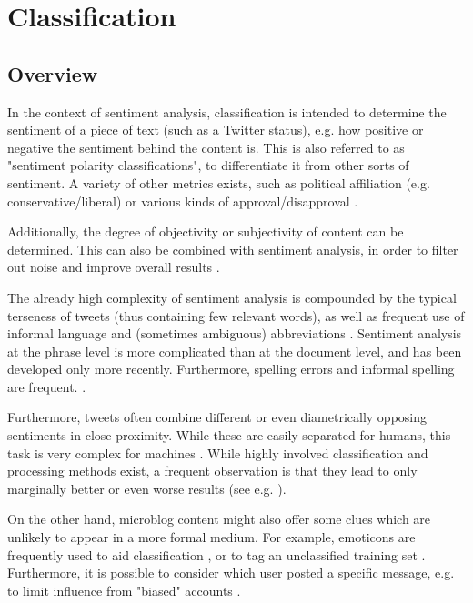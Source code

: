 \documentclass{sig-alternate}
\begin{document}
\section{Classification}

\subsection{Overview}

In the context of sentiment analysis, classification is intended to determine the sentiment of a piece of text (such as a Twitter status), e.g. how positive or negative the sentiment behind the content is. This is also referred to as "sentiment polarity classifications", to differentiate it from other sorts of sentiment. A variety of other metrics exists, such as political affiliation (e.g. conservative/liberal) or various kinds of approval/disapproval \cite{pang2008opinion}.

Additionally, the degree of objectivity or subjectivity of content can be determined. This can also be combined with sentiment analysis, in order to filter out noise and improve overall results \cite{barbosa2010robust}.


The already high complexity of sentiment analysis is compounded by the typical terseness of tweets (thus containing few relevant words), as well as frequent use of informal language and (sometimes ambiguous) abbreviations \cite{kouloumpis2011twitter}. Sentiment analysis at the phrase level is more complicated than at the document level, and has been developed only more recently. Furthermore, spelling errors and informal spelling are frequent. \cite{agarwal2011sentiment}.

Furthermore, tweets often combine different or even diametrically opposing sentiments in close proximity. While these are easily separated for humans, this task is very complex for machines \cite{vinodhini2012sentiment}. While highly involved classification and processing methods exist, a frequent observation is that they lead to only marginally better or even worse results (see e.g. \cite{agarwal2011sentiment}).

On the other hand, microblog content might also offer some clues which are unlikely to appear in a more formal medium. For example, emoticons are frequently used to aid classification \cite{agarwal2011sentiment, kouloumpis2011twitter}, or to tag an unclassified training set \cite{go2009twitter}. Furthermore, it is possible to consider which user posted a specific message, e.g. to limit influence from "biased" accounts \cite{barbosa2010robust}.
\end{document}
